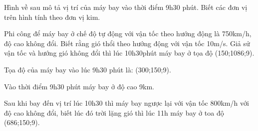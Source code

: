 \begin{question}[type=true_false,difficulty=3,code={II-3}]
Hình về sau mô tả vị trí của máy bay vào thời điểm 9h30 phút. Biết các đơn vị trên hình tính theo đơn vị kim.



\begin{statement}[correct=true,label=a]
Phi công để máy bay ở chế độ tự động với vận tốc theo hướng động là 750km/h, độ cao không đổi. Biết rằng gió thổi theo hướng động với vận tốc 10m/s. Giả sử vận tốc và hướng gió không đổi thì lúc 10h30phút máy bay ở tọa độ (150;1086;9).
\end{statement}

\begin{statement}[correct=false,label=b]
Tọa độ của máy bay vào lúc 9h30 phút là: (300;150;9).
\end{statement}

\begin{statement}[correct=true,label=c]
Vào thời điểm 9h30 phút máy bay ở độ cao 9km.
\end{statement}

\begin{statement}[correct=false,label=d]
Sau khi bay đến vị trí lúc 10h30 thì máy bay ngược lại với vận tốc 800km/h với độ cao không đổi, biết lúc đó trời lặng gió thì lúc 11h máy bay ở toa độ (686;150;9).
\end{statement}

\end{question}